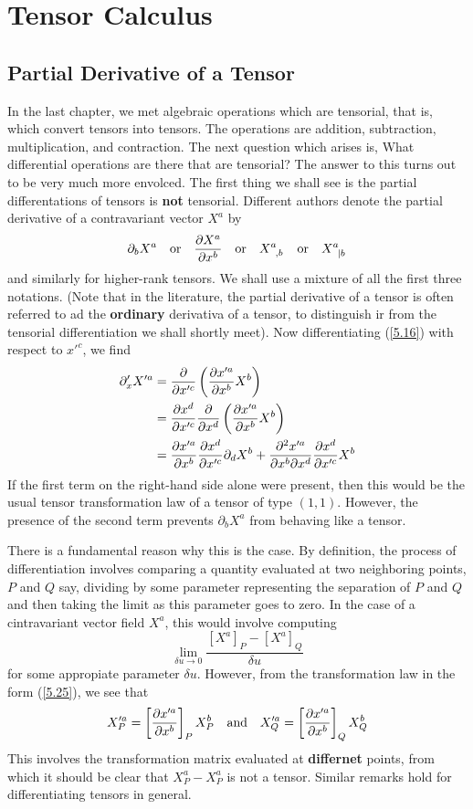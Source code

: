 \chapter{Tensor Calculus}\label{cap:6}
\section{Partial Derivative of a Tensor}\label{sec:6.1}
In the last chapter, we met algebraic operations which are tensorial, that is, which convert tensors into tensors. The operations are addition, subtraction, multiplication, and contraction. The next question which arises is, What differential operations are there that are tensorial? The answer to this turns out to be very much more envolced. The first thing we shall see is the partial differentations of tensors is \textbf{not} tensorial. Different authors denote the partial derivative of a contravariant vector $X^{a}$ by $$\partial_bX^{a}\quad \mbox{or} \quad \pdv{X^{a}}{x^b}\quad\mbox{or}\quad \tensor{X}{^{a}_{,b}} \quad \mbox{or}\quad \tensor{X}{^{a}_{|b}}$$
and similarly for higher-rank tensors. We shall use a mixture of all the first three notations. (Note that in the literature, the partial derivative of a tensor is often referred to ad the \textbf{ordinary} derivativa of a tensor, to distinguish ir from the tensorial differentiation we shall shortly meet). Now differentiating (\ref{5.16}) with respect to $x'^c$, we find
\begin{align}
	\nonumber\partial '_xX'^{a}&=\frac{\partial}{\partial x'^c}\left(\pdv{x'^{a}}{x^b}X^b\right)\\
					\nonumber					&=\pdv{x^d}{x'^c}\frac{\partial}{\partial x^d}\left(\pdv{x'^{a}}{x^b}X^b\right)\\
														&=\pdv{x'^{a}}{x^b}\pdv{x^d}{x'^c}\partial _dX^b+\frac{\partial^2x'^{a}}{\partial x^b\partial x^d}\pdv{x^d}{x'^c}X^b\label{6.1}
\end{align}
If the first term on the right-hand side alone were present, then this would be the usual tensor transformation law of a tensor of type $(1,1)$. However, the presence of the second term prevents $\partial_bX^{a}$ from behaving like a tensor.

There is a fundamental reason why this is the case. By definition, the process of differentiation involves comparing a quantity evaluated at two neighboring points, $P$ and $Q$ say, dividing by some parameter representing the separation of $P$ and $Q$ and then taking the limit as this parameter goes to zero. In the case of a cintravariant vector field $X^{a}$, this would involve computing $$\lim_{\delta u\to 0}\frac{[X^{a}]_P-[X^{a}]_Q}{\delta u}$$ for some appropiate parameter $\delta u$. However, from the transformation law in the form (\ref{5.25}), we see that $$X'^{a}_P=\left[\pdv{x'^{a}}{x^b}\right]_PX^b_P\quad\mbox{and}\quad X'^{a}_Q=\left[\pdv{x'^{a}}{x^b}\right]_QX^b_Q$$ This involves the transformation matrix evaluated at \textbf{differnet} points, from which it should be clear that $X^{a}_P - X^{a}_P$ is not a tensor. Similar remarks hold for differentiating tensors in general.

